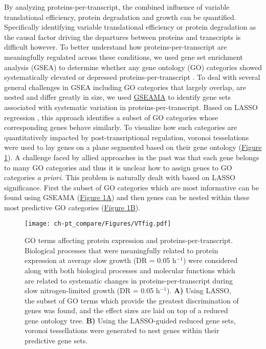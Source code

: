 By analyzing proteins-per-transcript, the combined influence of variable translational efficiency, protein degradation and growth can be quantified. Specifically identifying variable translational efficiency or protein degradation as the causal factor driving the departures between proteins and transcripts is difficult however. To better understand how proteins-per-transcript are meaningfully regulated across these conditions, we used gene set enrichment analysis (GSEA) to determine whether any gene ontology (GO) categories showed systematically elevated or depressed proteins-per-transcript \cite{Subramanian:2005jt}. To deal with several general challenges in GSEA including GO categories that largely overlap, are nested and differ greatly in size, we used \href{https://github.com/dgrtwo/GSEAMA}{GSEAMA} to identify gene sets associated with systematic variation in proteins-per-transcript. Based on LASSO regression \cite{Tibshirani:1996wb}, this approach identifies a subset of GO categories whose corresponding genes behave similarly. To visualize how such categories are quantitatively impacted by post-transriptional regulation, voronoi tesselations \cite{Aurenhammer:1991ca} were used to lay genes on a plane segmented based on their gene ontology (\hyperref[voronoiFig]{Figure \ref{voronoiFig}}). A challenge faced by allied approaches in the past \cite{Halligan:2007ds, Otto:2010br} was that each gene belongs to many GO categories and thus it is unclear how to assign genes to GO categories \textit{a priori}. This problem is naturally dealt with based on LASSO significance. First the subset of GO categories which are most informative can be found using GSEAMA (\hyperref[voronoiFig]{Figure \ref{voronoiFig}A}) and then genes can be nested within these most predictive GO categories (\hyperref[voronoiFig]{Figure \ref{voronoiFig}B}).

\begin{figure}[hbtp]
\begin{center}
\texttt{[image: ch-pt\_compare/Figures/VTfig.pdf]}
\end{center}
\caption[GO terms affecting protein expression and proteins-per-transcript]{GO terms affecting protein expression and proteins-per-transcript. Biological processes that were meaningfully related to protein expression at average slow growth (DR = 0.05 h$^{-1}$) were considered along with both biological processes and molecular functions which are related to systematic changes in proteins-per-transcript during slow nitrogen-limited growth (DR = 0.05 h$^{-1}$). \textbf{A)} Using LASSO, the subset of GO terms which provide the greatest discrimination of genes was found, and the effect sizes are laid on top of a reduced gene ontology tree. \textbf{B)} Using the LASSO-guided reduced gene sets, voronoi tessellations were generated to nest genes within their predictive gene sets.}
\label{voronoiFig}
\end{figure}

